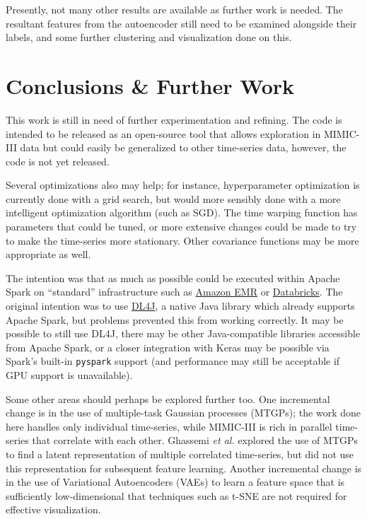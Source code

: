 \documentclass[journal]{IEEEtran}
\begin{document}
Presently, not many other results are available as further work is
needed.  The resultant features from the autoencoder still need to be
examined alongside their labels, and some further clustering and
visualization done on this.

\section{Conclusions \& Further Work}

This work is still in need of further experimentation and refining.
The code is intended to be released as an open-source tool that allows
exploration in MIMIC-III data but could easily be generalized to other
time-series data, however, the code is not yet released.

Several optimizations also may help; for instance, hyperparameter
optimization is currently done with a grid search, but would more
sensibly done with a more intelligent optimization algorithm (such as
SGD).  The time warping function has parameters that could be tuned,
or more extensive changes\cite{Lasko2015} could be made to try to make
the time-series more stationary.  Other covariance functions may be
more appropriate as well.

The intention was that as much as possible could be executed within
Apache Spark on ``standard'' infrastructure such as
\href{https://aws.amazon.com/emr/}{Amazon EMR} or
\href{https://databricks.com/}{Databricks}.  The original intention
was to use \href{https://deeplearning4j.org/}{DL4J}, a native Java
library which already supports Apache Spark, but problems prevented
this from working correctly.  It may be possible to still use DL4J,
there may be other Java-compatible libraries accessible from Apache
Spark, or a closer integration with Keras may be possible via Spark's
built-in \texttt{pyspark} support (and performance may still be
acceptable if GPU support is unavailable).

Some other areas should perhaps be explored further too.  One
incremental change is in the use of multiple-task Gaussian processes
(MTGPs); the work done here handles only individual time-series, while
MIMIC-III is rich in parallel time-series that correlate with each
other.  Ghassemi \emph{et al.}\cite{Ghassemi2015} explored the use of
MTGPs to find a latent representation of multiple correlated
time-series, but did not use this representation for subsequent
feature learning.  Another incremental change is in the use of
Variational Autoencoders (VAEs) to learn a feature space that is
sufficiently low-dimensional that techniques such as t-SNE are not
required for effective visualization.
\end{document}
